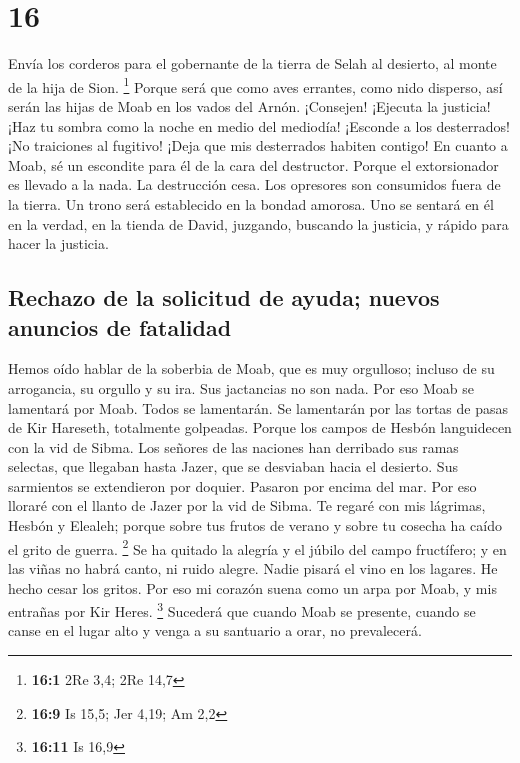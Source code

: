 \hypertarget{section-15}{%
\section{16}\label{section-15}}

 Envía los corderos para el gobernante de la tierra de
Selah al desierto, al monte de la hija de Sion. \footnote{\textbf{16:1}
  2Re 3,4; 2Re 14,7}  Porque será que como aves errantes,
como nido disperso, así serán las hijas de Moab en los vados del Arnón.
 ¡Consejen! ¡Ejecuta la justicia! ¡Haz tu sombra como la
noche en medio del mediodía! ¡Esconde a los desterrados! ¡No traiciones
al fugitivo!  ¡Deja que mis desterrados habiten contigo!
En cuanto a Moab, sé un escondite para él de la cara del destructor.
Porque el extorsionador es llevado a la nada. La destrucción cesa. Los
opresores son consumidos fuera de la tierra.  Un trono
será establecido en la bondad amorosa. Uno se sentará en él en la
verdad, en la tienda de David, juzgando, buscando la justicia, y rápido
para hacer la justicia.

\hypertarget{rechazo-de-la-solicitud-de-ayuda-nuevos-anuncios-de-fatalidad}{%
\subsection{Rechazo de la solicitud de ayuda; nuevos anuncios de
fatalidad}\label{rechazo-de-la-solicitud-de-ayuda-nuevos-anuncios-de-fatalidad}}

 Hemos oído hablar de la soberbia de Moab, que es muy
orgulloso; incluso de su arrogancia, su orgullo y su ira. Sus jactancias
no son nada.  Por eso Moab se lamentará por Moab. Todos se
lamentarán. Se lamentarán por las tortas de pasas de Kir Hareseth,
totalmente golpeadas.  Porque los campos de Hesbón
languidecen con la vid de Sibma. Los señores de las naciones han
derribado sus ramas selectas, que llegaban hasta Jazer, que se desviaban
hacia el desierto. Sus sarmientos se extendieron por doquier. Pasaron
por encima del mar.  Por eso lloraré con el llanto de
Jazer por la vid de Sibma. Te regaré con mis lágrimas, Hesbón y Elealeh;
porque sobre tus frutos de verano y sobre tu cosecha ha caído el grito
de guerra. \footnote{\textbf{16:9} Is 15,5; Jer 4,19; Am 2,2}
 Se ha quitado la alegría y el júbilo del campo
fructífero; y en las viñas no habrá canto, ni ruido alegre. Nadie pisará
el vino en los lagares. He hecho cesar los gritos.  Por
eso mi corazón suena como un arpa por Moab, y mis entrañas por Kir
Heres. \footnote{\textbf{16:11} Is 16,9}  Sucederá que
cuando Moab se presente, cuando se canse en el lugar alto y venga a su
santuario a orar, no prevalecerá.

